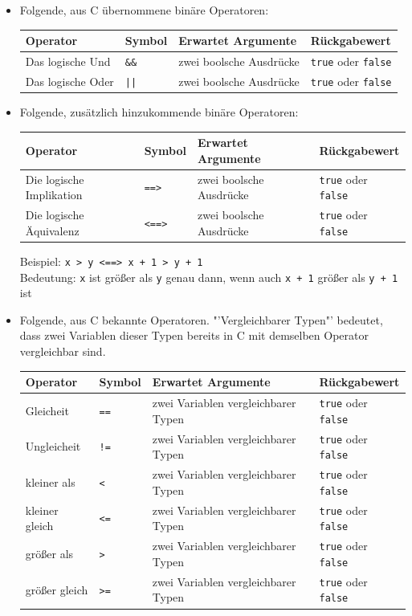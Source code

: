 \documentclass[a4paper]{scrreprt}
\begin{document}
\begin{itemize}
\item Folgende, aus C übernommene binäre Operatoren:
\begin{table}[H]
\begin{tabular}{|p{3cm}|p{}|p{}|p{3cm}|}
	Operator & Symbol & Erwartet Argumente & Rückgabewert \\
	\hline
	Das logische Und & \verb!&&! & zwei boolsche Ausdrücke & \texttt{true} oder \texttt{false} \\
	Das logische Oder & \verb!||! & zwei boolsche Ausdrücke & \texttt{true} oder \texttt{false}	
	\end{tabular}
\end{table}	

\item Folgende, zusätzlich hinzukommende binäre Operatoren:
\begin{table}[H]
\begin{tabular}{|p{4cm}|p{}|p{}|p{3cm}|}
	Operator & Symbol & Erwartet Argumente & Rückgabewert \\
	\hline
	Die logische Implikation & \verb!==>! & zwei boolsche Ausdrücke & \texttt{true} oder \texttt{false} \\
	Die logische Äquivalenz & \verb!<==>! & zwei boolsche Ausdrücke & \texttt{true} oder \texttt{false}	
\end{tabular}
\end{table}	

Beispiel: \verb!x > y <==> x + 1 > y + 1! \\
Bedeutung: \verb!x! ist größer als \verb!y! genau dann, wenn auch \verb!x + 1! größer als \verb!y + 1! ist 

\item Folgende, aus C bekannte Operatoren. "'Vergleichbarer Typen"' bedeutet, dass zwei Variablen dieser Typen bereits in C mit demselben Operator vergleichbar sind. 
\begin{table}[H]
\begin{tabular}{|p{}|p{}|p{6cm}|p{3cm}|}
	Operator & Symbol & Erwartet Argumente & Rückgabewert \\
	\hline
	Gleicheit & \verb!==! & zwei Variablen vergleichbarer Typen & \texttt{true} oder \texttt{false} \\
	Ungleicheit & \verb|!=| & zwei Variablen vergleichbarer Typen & \texttt{true} oder \texttt{false} \\
	kleiner als & \texttt{<} & zwei Variablen vergleichbarer Typen & \texttt{true} oder \texttt{false} \\
	kleiner gleich & \texttt{<=} & zwei Variablen vergleichbarer Typen & \texttt{true} oder \texttt{false} \\
	größer als & \texttt{>} & zwei Variablen vergleichbarer Typen & \texttt{true} oder \texttt{false} \\
	größer gleich & \texttt{>=} & zwei Variablen vergleichbarer Typen & \texttt{true} oder \texttt{false} \\
\end{tabular}
\end{table}	
 	

\end{itemize}
\end{document}
